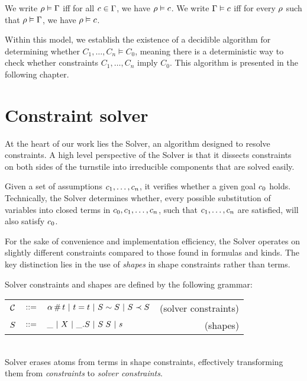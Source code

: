 \documentclass[english, mgr]{iithesis}
\begin{document}
We write $\rho \vDash \Gamma$ iff for all $c \in \Gamma$,
we have $\rho \vDash c$.
We write $\Gamma \vDash c$ iff
for every $\rho$ such that $\rho \vDash \Gamma$,
we have $\rho \vDash c$.

Within this model, we establish the existence of a decidible algorithm for determining whether $C_1, \ldots, C_n \models C_0$, meaning there is a deterministic way to check whether constraints $C_1, \ldots, C_n$ imply $C_0$. This algorithm is presented in the following chapter.


\chapter{Constraint solver}
At the heart of our work lies the Solver, an algorithm designed to resolve constraints.
A high level perspective of the Solver is that it dissects constraints on both sides of the turnstile into irreducible components that are solved easily.

Given a set of assumptions $c_1, \dots, c_n$, it verifies whether a given goal $c_0$ holds.
Technically, the Solver determines whether,
every possible substitution of variables into closed terms in $c_0, c_1, \dots, c_n$,
such that $c_1, \dots, c_n$ are satisfied, will also satisfy $c_0$.

For the sake of convenience and implementation efficiency, the Solver operates
on slightly different constraints compared to those found in formulas and kinds.
The key distinction lies in the use of \textit{shapes} in shape constraints rather than terms.

Solver constraints and shapes are defined by the following grammar: \\
\begin{tabular}{rclr}
  $\mathcal{C}$ & $::=$ & $\alpha \,\#\, t
  \ |\  t = t
  \ |\  S \sim S
  \ |\  S \prec S$
      & (solver constraints) \\
  $S$      & $::=$ & $\_
                 \ |\   X
                 \ |\  \_. S
                 \ |\  S \; S
                 \ |\  s$
      & (shapes)
\end{tabular}\\
Solver erases atoms from terms in shape constraints,
effectively transforming them from \textit{constraints} to \textit{solver constraints}.
\end{document}
